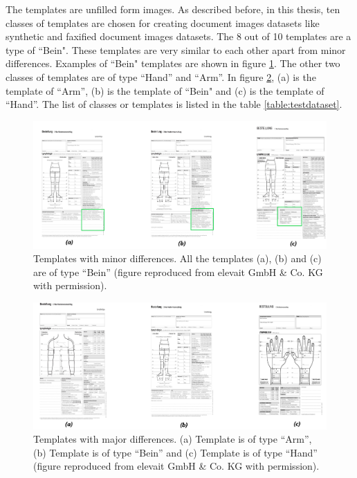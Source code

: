 The templates are unfilled form images. As described before, in this thesis, ten classes of templates are chosen for creating document images datasets like synthetic and faxified document images datasets. The 8 out of 10 templates are a type of ``Bein". These templates are very similar to each other apart from minor differences. Examples of ``Bein" templates are shown in figure \ref{fig:TemplatesWithMinorDifference}. The other two classes of templates are of type ``Hand'' and ``Arm''. In figure \ref{fig:TemplatesWithMajorDifference}, (a) is the template of ``Arm'', (b) is the template of ``Bein" and (c) is the template of ``Hand''. The list of classes or templates is listed in the table \ref{table:testdataset}.

\begin{figure}[H]
        \begin{center}
	    \includegraphics[scale=0.30]{images/Implementation/TemplatesWithMinorDifference.png}
	    \caption[Templates with minor differences.]{Templates with minor differences. All the templates (a), (b) and (c) are of type ``Bein'' (figure reproduced from elevait GmbH \& Co. KG with permission).}
	    \label{fig:TemplatesWithMinorDifference}
	    \end{center}
\end{figure}



\begin{figure}[H]
        \begin{center}
	    \includegraphics[scale=0.30]{images/Implementation/TemplatesWithMajorDifference.png}
	    \caption[Templates with major differences.]{Templates with major differences. (a) Template is of type ``Arm'', (b) Template is of type ``Bein'' and (c) Template is of type ``Hand'' (figure reproduced from elevait GmbH \& Co. KG with permission).}
	    \label{fig:TemplatesWithMajorDifference}
	    \end{center}
\end{figure}





